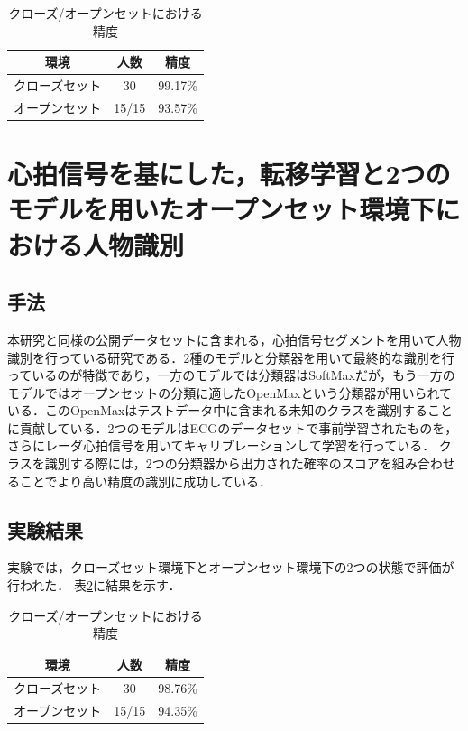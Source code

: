 \begin{table}[H]
\caption{クローズ/オープンセットにおける精度}
\centering
\begin{tabular}{ccc}
\hline
環境 & 人数 & 精度 \\
\hline
クローズセット & 30 & 99.17\% \\
オープンセット & 15/15 & 93.57\% \\
\hline
\end{tabular}
\label{table:HeartSignature}
\end{table}

\section{心拍信号を基にした，転移学習と2つのモデルを用いたオープンセット環境下における人物識別\cite{paper:Xing}}
\subsection{手法}
本研究と同様の公開データセットに含まれる，心拍信号セグメントを用いて人物識別を行っている研究である．2種のモデルと分類器を用いて最終的な識別を行っているのが特徴であり，一方のモデルでは分類器はSoftMaxだが，もう一方のモデルではオープンセットの分類に適したOpenMax\cite{paper:openmax}という分類器が用いられている．このOpenMaxはテストデータ中に含まれる未知のクラスを識別することに貢献している．2つのモデルはECGのデータセットで事前学習されたものを，さらにレーダ心拍信号を用いてキャリブレーションして学習を行っている．
クラスを識別する際には，2つの分類器から出力された確率のスコアを組み合わせることでより高い精度の識別に成功している．

\subsection{実験結果}
実験では，クローズセット環境下とオープンセット環境下の2つの状態で評価が行われた．
表\ref{table:Xing}に結果を示す．

\begin{table}[H]
\caption{クローズ/オープンセットにおける精度}
\centering
\begin{tabular}{ccc}
\hline
環境 & 人数 & 精度 \\
\hline
クローズセット & 30 & 98.76\% \\
オープンセット & 15/15 & 94.35\% \\
\hline
\end{tabular}
\label{table:Xing}
\end{table}


